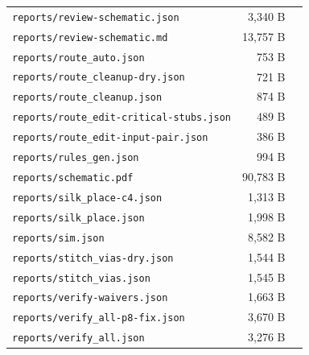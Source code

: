 \documentclass[11pt,a4paper]{article}
\begin{document}
{\begin{longtable}{p{9cm}rp{4cm}}
\texttt{reports/review-schematic.json} & 3,340 B &  \\
\texttt{reports/review-schematic.md} & 13,757 B &  \\
\texttt{reports/route\_auto.json} & 753 B &  \\
\texttt{reports/route\_cleanup-dry.json} & 721 B &  \\
\texttt{reports/route\_cleanup.json} & 874 B &  \\
\texttt{reports/route\_edit-critical-stubs.json} & 489 B &  \\
\texttt{reports/route\_edit-input-pair.json} & 386 B &  \\
\texttt{reports/rules\_gen.json} & 994 B &  \\
\texttt{reports/schematic.pdf} & 90,783 B &  \\
\texttt{reports/silk\_place-c4.json} & 1,313 B &  \\
\texttt{reports/silk\_place.json} & 1,998 B &  \\
\texttt{reports/sim.json} & 8,582 B &  \\
\texttt{reports/stitch\_vias-dry.json} & 1,544 B &  \\
\texttt{reports/stitch\_vias.json} & 1,545 B &  \\
\texttt{reports/verify-waivers.json} & 1,663 B &  \\
\texttt{reports/verify\_all-p8-fix.json} & 3,670 B &  \\
\texttt{reports/verify\_all.json} & 3,276 B &  \\
\bottomrule
\end{longtable}
}
\end{document}
